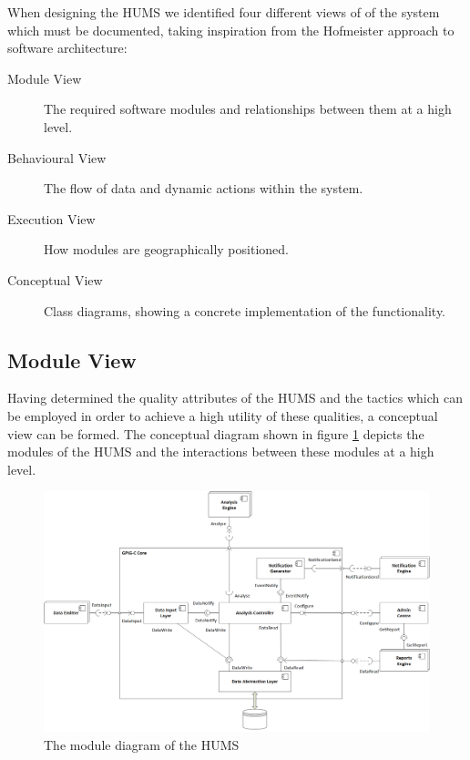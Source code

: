\documentclass[10pt,a4paper]{article}
\begin{document}
When designing the HUMS we identified four different views of of the
system which must be documented, taking inspiration from the Hofmeister approach to software architecture:  %

\begin{description}
  \item[Module View] The required software modules and relationships
    between them at a high level.

  \item[Behavioural View] The flow of data and dynamic actions within
    the system.

  \item[Execution View] How modules are geographically positioned.

  \item[Conceptual View] Class diagrams, showing a concrete
    implementation of the functionality.
\end{description}

\subsection{Module View}
\label{sec:architecture-moduleview}

Having determined the quality attributes of the HUMS and the tactics
which can be employed in order to achieve a high utility of these
qualities, a conceptual view can be formed. The conceptual diagram
shown in figure \ref{fig:ComponentDiagram} depicts the modules of the
HUMS and the interactions between these modules at a high level.


\begin{figure}[!ht]
  \centering
  \includegraphics[width=14cm]{images/ComponentDiagram.png}
  \caption{The module diagram of the HUMS}
  \label{fig:ComponentDiagram}
\end{figure}
\end{document}
